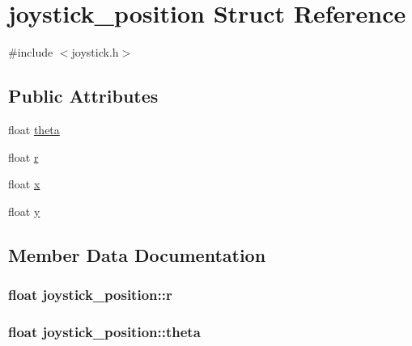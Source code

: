\hypertarget{structjoystick__position}{}\section{joystick\+\_\+position Struct Reference}
\label{structjoystick__position}


{\ttfamily \#include $<$joystick.\+h$>$}

\subsection*{Public Attributes}
\begin{DoxyCompactItemize}
\item 
float \hyperlink{structjoystick__position_ad738e8acb3656438c10d2ec7670639e5}{theta}
\item 
float \hyperlink{structjoystick__position_a0a9043868a14fce25888dd81b80f6c94}{r}
\item 
float \hyperlink{structjoystick__position_a71c3292c1be3c3400a388eac41a47ad3}{x}
\item 
float \hyperlink{structjoystick__position_ad8fc27fbd5404a4f8cdc1a045a0d689a}{y}
\end{DoxyCompactItemize}


\subsection{Member Data Documentation}
\subsubsection[{\texorpdfstring{r}{r}}]{\setlength{\rightskip}{0pt plus 5cm}float joystick\+\_\+position\+::r}\hypertarget{structjoystick__position_a0a9043868a14fce25888dd81b80f6c94}{}\label{structjoystick__position_a0a9043868a14fce25888dd81b80f6c94}
\subsubsection[{\texorpdfstring{theta}{theta}}]{\setlength{\rightskip}{0pt plus 5cm}float joystick\+\_\+position\+::theta}\hypertarget{structjoystick__position_ad738e8acb3656438c10d2ec7670639e5}{}\label{structjoystick__position_ad738e8acb3656438c10d2ec7670639e5}
